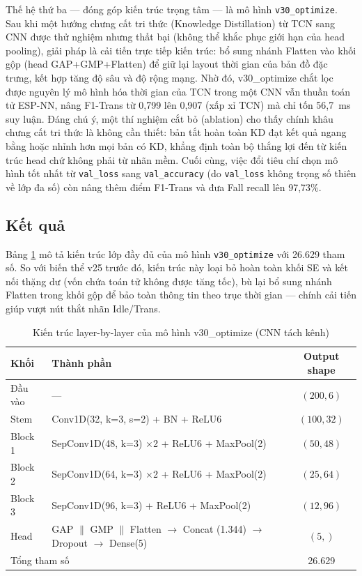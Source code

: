 \documentclass[../DoAn.tex]{subfiles}
\begin{document}
Thế hệ thứ ba --- đóng góp kiến trúc trọng tâm --- là mô hình \texttt{v30\_optimize}. Sau khi một hướng chưng cất tri thức (Knowledge Distillation) từ TCN sang CNN được thử nghiệm nhưng thất bại (không thể khắc phục giới hạn của head pooling), giải pháp là cải tiến trực tiếp kiến trúc: bổ sung nhánh Flatten vào khối gộp (head GAP+GMP+Flatten) để giữ lại layout thời gian của bản đồ đặc trưng, kết hợp tăng độ sâu và độ rộng mạng. Nhờ đó, v30\_optimize chắt lọc được nguyên lý mô hình hóa thời gian của TCN trong một CNN vẫn thuần toán tử ESP-NN, nâng F1-Trans từ 0,799 lên 0,907 (xấp xỉ TCN) mà chỉ tốn 56,7~ms suy luận. Đáng chú ý, một thí nghiệm cắt bỏ (ablation) cho thấy chính khâu chưng cất tri thức là không cần thiết: bản tắt hoàn toàn KD đạt kết quả ngang bằng hoặc nhỉnh hơn mọi bản có KD, khẳng định toàn bộ thắng lợi đến từ kiến trúc head chứ không phải từ nhãn mềm. Cuối cùng, việc đổi tiêu chí chọn mô hình tốt nhất từ \texttt{val\_loss} sang \texttt{val\_accuracy} (do \texttt{val\_loss} không trọng số thiên về lớp đa số) còn nâng thêm điểm F1-Trans và đưa Fall recall lên 97,73\%.

\subsection{Kết quả}

Bảng \ref{tab:v30opt_architecture} mô tả kiến trúc lớp đầy đủ của mô hình \texttt{v30\_optimize} với 26.629 tham số. So với biến thể v25 trước đó, kiến trúc này loại bỏ hoàn toàn khối SE và kết nối thặng dư (vốn chứa toán tử không được tăng tốc), bù lại bổ sung nhánh Flatten trong khối gộp để bảo toàn thông tin theo trục thời gian --- chính cải tiến giúp vượt nút thắt nhãn Idle/Trans.

\begin{table}[H]
\centering
\caption{Kiến trúc layer-by-layer của mô hình v30\_optimize (CNN tách kênh)}
\label{tab:v30opt_architecture}
\begin{tabular}{|l|l|c|}
\hline
\textbf{Khối} & \textbf{Thành phần} & \textbf{Output shape} \\
\hline
Đầu vào & --- & $(200, 6)$ \\
Stem    & Conv1D(32, k=3, s=2) + BN + ReLU6                  & $(100, 32)$ \\
Block 1 & SepConv1D(48, k=3) $\times$2 + ReLU6 + MaxPool(2)  & $(50, 48)$ \\
Block 2 & SepConv1D(64, k=3) $\times$2 + ReLU6 + MaxPool(2)  & $(25, 64)$ \\
Block 3 & SepConv1D(96, k=3) + ReLU6 + MaxPool(2)            & $(12, 96)$ \\
Head    & GAP $\parallel$ GMP $\parallel$ Flatten $\rightarrow$ Concat (1.344) $\rightarrow$ Dropout $\rightarrow$ Dense(5) & $(5,)$ \\
\hline
\multicolumn{2}{|l|}{Tổng tham số} & 26.629 \\
\hline
\end{tabular}
\end{table}
\end{document}
